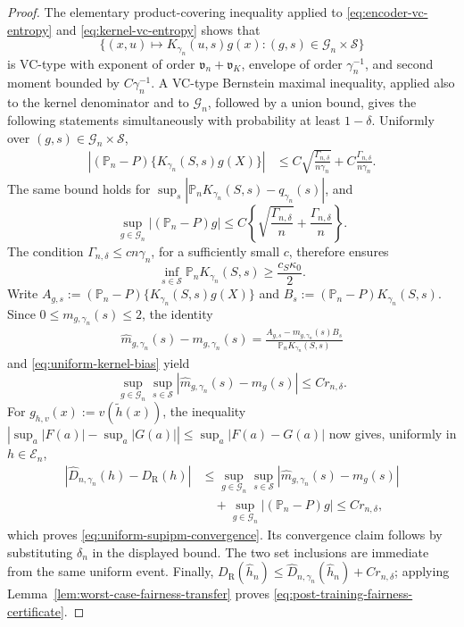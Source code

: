 \documentclass[10pt]{article}
\begin{document}
\begin{proof}
The elementary product-covering inequality applied to
\eqref{eq:encoder-vc-entropy} and \eqref{eq:kernel-vc-entropy} shows that
\[
  \bigl\{(x,u)\mapsto K_{\gamma_n}(u,s)g(x):
  (g,s)\in\mathcal G_n\times\mathcal S\bigr\}
\]
is VC-type with exponent of order
\(\mathfrak v_n+\mathfrak v_K\), envelope of order
\(\gamma_n^{-1}\), and second moment bounded by \(C\gamma_n^{-1}\).
A VC-type Bernstein maximal inequality, applied also to the kernel
denominator and to \(\mathcal G_n\), followed by a union bound, gives the
following statements simultaneously with probability at least
\(1-\delta\).  Uniformly over
\((g,s)\in\mathcal G_n\times\mathcal S\),
\begin{align*}
  \left|
    (\mathbb P_n-P)
    \{K_{\gamma_n}(S,s)g(X)\}
  \right|
  &\le C\sqrt{\frac{\Gamma_{n,\delta}}{n\gamma_n}}
       +C\frac{\Gamma_{n,\delta}}{n\gamma_n}.
\end{align*}
The same bound holds for
\(\sup_s|\mathbb P_nK_{\gamma_n}(S,s)-q_{\gamma_n}(s)|\), and
\begin{equation*}
  \sup_{g\in\mathcal G_n}|(\mathbb P_n-P)g|
  \le C\left\{
    \sqrt{\frac{\Gamma_{n,\delta}}{n}}
    +\frac{\Gamma_{n,\delta}}{n}
  \right\}.
\end{equation*}
The condition \(\Gamma_{n,\delta}\le cn\gamma_n\), for a sufficiently small
\(c\), therefore ensures
\[
  \inf_{s\in\mathcal S}\mathbb P_nK_{\gamma_n}(S,s)
  \ge \frac{c_S\kappa_0}{2}.
\]
Write
\(A_{g,s}:=(\mathbb P_n-P)\{K_{\gamma_n}(S,s)g(X)\}\) and
\(B_s:=(\mathbb P_n-P)K_{\gamma_n}(S,s)\).  Since
\(0\le m_{g,\gamma_n}(s)\le2\), the identity
\begin{align*}
  \widehat m_{g,\gamma_n}(s)-m_{g,\gamma_n}(s)
  =\frac{A_{g,s}-m_{g,\gamma_n}(s)B_s}
         {\mathbb P_nK_{\gamma_n}(S,s)}
\end{align*}
and \eqref{eq:uniform-kernel-bias} yield
\begin{equation*}
  \sup_{g\in\mathcal G_n}\sup_{s\in\mathcal S}
  \left|\widehat m_{g,\gamma_n}(s)-m_g(s)\right|
  \le C r_{n,\delta}.
\end{equation*}
For \(g_{h,v}(x):=v(\widetilde h(x))\), the inequality
\(\left|\sup_a|F(a)|-\sup_a|G(a)|\right|
\le\sup_a|F(a)-G(a)|\) now gives, uniformly in
\(h\in\mathcal E_n\),
\begin{align*}
  |\widehat D_{n,\gamma_n}(h)-D_{\mathrm R}(h)|
  &\le
  \sup_{g\in\mathcal G_n}\sup_{s\in\mathcal S}
  |\widehat m_{g,\gamma_n}(s)-m_g(s)|\\
  &\quad+
  \sup_{g\in\mathcal G_n}|(\mathbb P_n-P)g|
  \le Cr_{n,\delta},
\end{align*}
which proves \eqref{eq:uniform-supipm-convergence}.  Its convergence claim
follows by substituting \(\delta_n\) in the displayed bound.  The two set
inclusions are immediate from the same uniform event.  Finally,
\(D_{\mathrm R}(\widehat h_n)\le
\widehat D_{n,\gamma_n}(\widehat h_n)+Cr_{n,\delta}\); applying
Lemma~\ref{lem:worst-case-fairness-transfer} proves
\eqref{eq:post-training-fairness-certificate}.
\end{proof}
\end{document}
